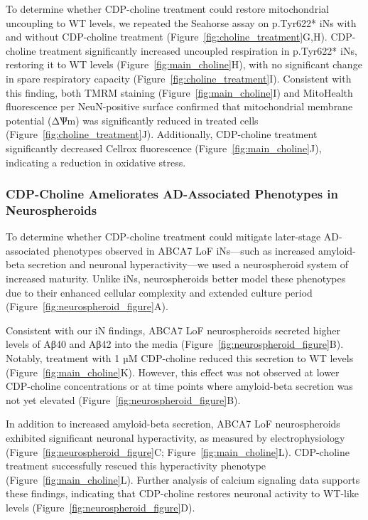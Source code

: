To determine whether CDP-choline treatment could restore mitochondrial uncoupling to WT levels, we repeated the Seahorse assay on p.Tyr622* iNs with and without CDP-choline treatment (Figure~\ref{fig:choline_treatment}G,H). CDP-choline treatment significantly increased uncoupled respiration in p.Tyr622* iNs, restoring it to WT levels (Figure~\ref{fig:main_choline}H), with no significant change in spare respiratory capacity (Figure~\ref{fig:choline_treatment}I). Consistent with this finding, both TMRM staining (Figure~\ref{fig:main_choline}I) and MitoHealth fluorescence per NeuN-positive surface confirmed that mitochondrial membrane potential (ΔѰm) was significantly reduced in treated cells (Figure~\ref{fig:choline_treatment}J). Additionally, CDP-choline treatment significantly decreased Cellrox fluorescence (Figure~\ref{fig:main_choline}J), indicating a reduction in oxidative stress. 

\subsubsection{CDP-Choline Ameliorates AD-Associated Phenotypes in Neurospheroids}
To determine whether CDP-choline treatment could mitigate later-stage AD-associated phenotypes observed in ABCA7 LoF iNs—such as increased amyloid-beta secretion and neuronal hyperactivity—we used a neurospheroid system of increased maturity. Unlike iNs, neurospheroids better model these phenotypes due to their enhanced cellular complexity and extended culture period (Figure~\ref{fig:neurospheroid_figure}A).

Consistent with our iN findings, ABCA7 LoF neurospheroids secreted higher levels of Aβ40 and Aβ42 into the media (Figure~\ref{fig:neurospheroid_figure}B). Notably, treatment with 1 µM CDP-choline reduced this secretion to WT levels (Figure~\ref{fig:main_choline}K). However, this effect was not observed at lower CDP-choline concentrations or at time points where amyloid-beta secretion was not yet elevated (Figure~\ref{fig:neurospheroid_figure}B).

In addition to increased amyloid-beta secretion, ABCA7 LoF neurospheroids exhibited significant neuronal hyperactivity, as measured by electrophysiology (Figure~\ref{fig:neurospheroid_figure}C; Figure~\ref{fig:main_choline}L). CDP-choline treatment successfully rescued this hyperactivity phenotype (Figure~\ref{fig:main_choline}L). Further analysis of calcium signaling data supports these findings, indicating that CDP-choline restores neuronal activity to WT-like levels (Figure~\ref{fig:neurospheroid_figure}D).

